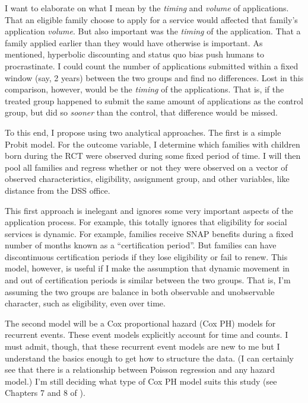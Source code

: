 \documentclass[12pt,letterpaperpaper,]{book}
\begin{document}
I want to elaborate on what I mean by the \emph{timing} and
\emph{volume} of applications. That an eligible family choose to apply
for a service would affected that family's application \emph{volume}.
But also important was the \emph{timing} of the application. That a
family applied earlier than they would have otherwise is important. As
mentioned, hyperbolic discounting and status quo bias push humans to
procrastinate. I could count the number of applications submitted within
a fixed window (say, 2 years) between the two groups and find no
differences. Lost in this comparison, however, would be the
\emph{timing} of the applications. That is, if the treated group
happened to submit the same amount of applications as the control group,
but did so \emph{sooner} than the control, that difference would be
missed.

To this end, I propose using two analytical approaches. The first is a
simple Probit model. For the outcome variable, I determine which
families with children born during the RCT were observed during some
fixed period of time. I will then pool all families and regress whether
or not they were observed on a vector of observed characteristics,
eligibility, assignment group, and other variables, like distance from
the DSS office.

This first approach is inelegant and ignores some very important aspects
of the application process. For example, this totally ignores that
eligibility for social services is dynamic. For example, families
receive SNAP benefits during a fixed number of months known as a
``certification period''. But families can have discontinuous
certification periods if they lose eligibility or fail to renew. This
model, however, is useful if I make the assumption that dynamic movement
in and out of certification periods is similar between the two groups.
That is, I'm assuming the two groups are balance in both observable and
unobservable character, such as eligibility, even over time.

The second model will be a Cox proportional hazard (Cox PH) models for
recurrent events. These event models explicitly account for time and
counts. I must admit, though, that these recurrent event models are new
to me but I understand the basics enough to get how to structure the
data. (I can certainly see that there is a relationship between Poisson
regression and any hazard model.) I'm still deciding what type of Cox PH
model suits this study (see Chapters 7 and 8 of
\citet{aalen_survival_2008}).
\end{document}
